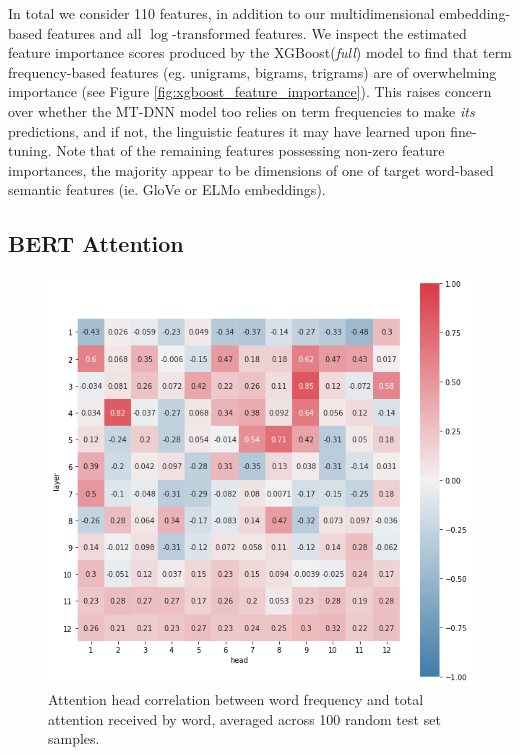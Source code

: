 \documentclass[11pt,a4paper]{article}
\begin{document}
In total we consider 110 features, in addition to our multidimensional embedding-based features and all $\log$-transformed features. We inspect the estimated feature importance scores produced by the XGBoost(\textit{full}) model to find that term frequency-based features (eg. unigrams, bigrams, trigrams) are of overwhelming importance (see Figure \ref{fig:xgboost_feature_importance}). This raises concern over whether the MT-DNN model too relies on term frequencies to make \textit{its} predictions, and if not, the linguistic features it may have learned upon fine-tuning. Note that of the remaining features possessing non-zero feature importances, the majority appear to be dimensions of one of target word-based semantic features (ie. GloVe or ELMo embeddings).

\subsection{BERT Attention}

\begin{figure}
  \centering
  \includegraphics[scale=0.375]{head_correlations_tf.png}
  \captionsetup{justification=centering}
  \caption{\label{fig:head_correlations_tf} Attention head correlation between word frequency and total attention received by word, averaged across 100 random test set samples.}
\end{figure}
\end{document}
